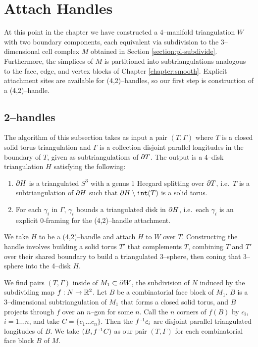 \section{Attach Handles}
\label{section:pl-handle}

At this point in the chapter we have constructed a 4--manifold triangulation $W$ with two boundary components, each equivalent via subdivision to the 3--dimensional cell complex $M$ obtained in Section \ref{section:pl-subdivide}.
Furthermore, the simplices of $M$ is partitioned into subtriangulations analogous to the face, edge, and vertex blocks of Chapter \ref{chapter:smooth}.
Explicit attachment sites are available for (4,2)--handles, so our first step is construction of a (4,2)--handle.

\subsection{2--handles}
\label{section:pl-2-handle}

The algorithm of this subsection takes as input a pair $(T,\Gamma)$ where $T$ is a closed solid torus triangulation and $\Gamma$ is a collection disjoint parallel longitudes in the boundary of $T$, given as subtriangulations of $\partial T$.
The output is a 4--disk triangulation $H$ satisfying the following:
\begin{enumerate}
	\item $\partial H$ is a triangulated $S^3$ with a genus 1 Heegard splitting over $\partial T$, i.e.\ $T$ is a subtriangulation of $\partial H$ such that $\partial H\setminus \texttt{int}(T)$ is a solid torus.
	\item For each $\gamma_i$ in $\Gamma$, $\gamma_i$ bounds a triangulated disk in $\partial H$, i.e.\ each $\gamma_i$ is an explicit 0-framing for the (4,2)--handle attachment.
\end{enumerate}
We take $H$ to be a (4,2)--handle and attach $H$ to $W$ over $T$.
Constructing the handle involves building a solid torus $T'$ that complements $T$, combining $T$ and $T'$ over their shared boundary to build a triangulated 3--sphere, then coning that 3--sphere into the 4--disk $H$.

We find pairs $(T,\Gamma)$ inside of $M_1\subset\partial W$, the subdivision of $N$ induced by the subdividing map $f:N\to\mathbb{R}^2$.
Let $B$ be a combinatorial face block of $M_1$.
$B$ is a 3--dimensional subtriangulation of $M_1$ that forms a closed solid torus,
and $B$ projects through $f$ over an $n$--gon for some $n$.
Call the $n$ corners of $f(B)$ by $c_i$, $i=1\dots n$, and take $C=\{c_1\dots c_n\}$.
Then the $f^{\,\text{-}1} c_i$ are disjoint parallel triangulated longitudes of $B$.
We take $(B, f^{\,\text{-}1} C)$ as our pair $(T,\Gamma)$ for each combinatorial face block $B$ of $M$.

